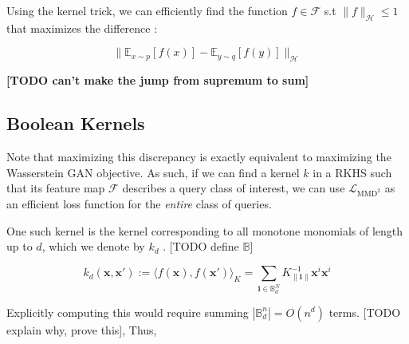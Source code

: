 \documentclass[
]{article}
\begin{document}
Using the kernel trick, we can efficiently find the function
$f \in \mathcal{F}$ s.t $\|f\|_\mathcal{H} \leq 1$ that maximizes the difference :

\[
  \|\mathbb{E}_{x\sim p}[f(x)] - \mathbb{E}_{y\sim q}[f(y)]\|_\mathcal{H}
\]

\textbf{[TODO can't make the jump from supremum to sum]}



\subsection{Boolean Kernels}



Note that maximizing this discrepancy is exactly equivalent to
maximizing the Wasserstein GAN objective. As such, if we can find a
kernel \(k\) in a RKHS such that its feature map \(\mathcal{F}\) 
describes a query class of interest, we can use
\(\mathcal{L}_{\mathrm{MMD}^2}\) as an efficient loss function for the
\emph{entire} class of queries.

One such kernel is the kernel corresponding to all monotone monomials of
length up to \(d\), which we denote by \(k_d\) \cite{PLA18}. {[}TODO
define \(\mathbb{B}\){]}

\[
  k_d (\mathbf{x}, \mathbf{x}'):= \langle f(\mathbf{x}), f (\mathbf{x}')\rangle_{K}=\sum_{\mathbf{i} \in \mathbb{B}^N_d} K_{\|\mathbf{i}\|}^{-1} \mathbf{x}^i \mathbf{x}^i
\]

Explicitly computing this would require summing
\(|\mathbb{B}_d^n| = O(n^d)\) terms. {[}TODO explain why, prove this{]},
Thus,
\end{document}
